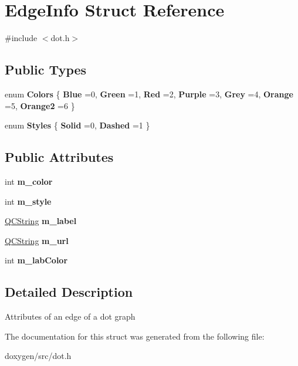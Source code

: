 \hypertarget{struct_edge_info}{}\section{Edge\+Info Struct Reference}
\label{struct_edge_info}


{\ttfamily \#include $<$dot.\+h$>$}

\subsection*{Public Types}
\begin{DoxyCompactItemize}
\item 
\mbox{\label{struct_edge_info_afd9f10f4693123d11e52bb1127f23228}} 
enum {\bfseries Colors} \{ \newline
{\bfseries Blue} =0, 
{\bfseries Green} =1, 
{\bfseries Red} =2, 
{\bfseries Purple} =3, 
\newline
{\bfseries Grey} =4, 
{\bfseries Orange} =5, 
{\bfseries Orange2} =6
 \}
\item 
\mbox{\label{struct_edge_info_a4fe2d2921d0f51d84da1bf48b3b4f2c5}} 
enum {\bfseries Styles} \{ {\bfseries Solid} =0, 
{\bfseries Dashed} =1
 \}
\end{DoxyCompactItemize}
\subsection*{Public Attributes}
\begin{DoxyCompactItemize}
\item 
\mbox{\label{struct_edge_info_a67f74484abac64da6f84291550232430}} 
int {\bfseries m\+\_\+color}
\item 
\mbox{\label{struct_edge_info_a9cd01dc1ff370a261f5850a1fa5812f9}} 
int {\bfseries m\+\_\+style}
\item 
\mbox{\label{struct_edge_info_ab735a4292f619dc43efb887bc4b42119}} 
\mbox{\hyperlink{class_q_c_string}{Q\+C\+String}} {\bfseries m\+\_\+label}
\item 
\mbox{\label{struct_edge_info_a0f0c4b78066f2ed4ed4e453ad8fdf428}} 
\mbox{\hyperlink{class_q_c_string}{Q\+C\+String}} {\bfseries m\+\_\+url}
\item 
\mbox{\label{struct_edge_info_a1074753351376c3d894e3a1777a643d1}} 
int {\bfseries m\+\_\+lab\+Color}
\end{DoxyCompactItemize}


\subsection{Detailed Description}
Attributes of an edge of a dot graph 

The documentation for this struct was generated from the following file\+:\begin{DoxyCompactItemize}
\item 
doxygen/src/dot.\+h\end{DoxyCompactItemize}

